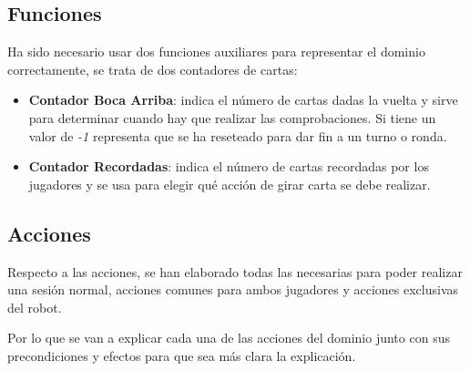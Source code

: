 \documentclass{uc3mpracticas}
\begin{document}
  \subsection{Funciones}

  Ha sido necesario usar dos funciones auxiliares para representar el dominio correctamente, se trata de dos contadores de cartas:

  \begin{itemize}
    \item \textbf{Contador Boca Arriba}: indica el número de cartas dadas la vuelta y sirve para determinar cuando hay que realizar las comprobaciones. Si tiene un valor de \textit{-1} representa que se ha reseteado para dar fin a un turno o ronda.
    \item \textbf{Contador Recordadas}: indica el número de cartas recordadas por los jugadores y se usa para elegir qué acción de girar carta se debe realizar.
  \end{itemize}


  \subsection{Acciones}

  Respecto a las acciones, se han elaborado todas las necesarias para poder realizar una sesión normal, acciones comunes para ambos jugadores y acciones exclusivas del robot.

  \vspace{2mm}

  Por lo que se van a explicar cada una de las acciones del dominio junto con sus precondiciones y efectos para que sea más clara la explicación.
\end{document}
